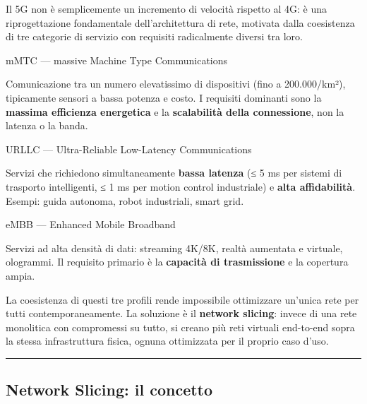 \documentclass[
  italian,
  openany]{book}
\begin{document}
Il 5G non è semplicemente un incremento di velocità rispetto al 4G: è
una riprogettazione fondamentale dell'architettura di rete, motivata
dalla coesistenza di tre categorie di servizio con requisiti
radicalmente diversi tra loro.

\begin{calloutdefinition}{mMTC — massive Machine Type Communications}

Comunicazione tra un numero elevatissimo di dispositivi (fino a
200.000/km²), tipicamente sensori a bassa potenza e costo. I requisiti
dominanti sono la \textbf{massima efficienza energetica} e la
\textbf{scalabilità della connessione}, non la latenza o la banda.

\end{calloutdefinition}

\begin{calloutdefinition}{URLLC — Ultra-Reliable Low-Latency Communications}

Servizi che richiedono simultaneamente \textbf{bassa latenza} (≤ 5 ms
per sistemi di trasporto intelligenti, ≤ 1 ms per motion control
industriale) e \textbf{alta affidabilità}. Esempi: guida autonoma, robot
industriali, smart grid.

\end{calloutdefinition}

\begin{calloutdefinition}{eMBB — Enhanced Mobile Broadband}

Servizi ad alta densità di dati: streaming 4K/8K, realtà aumentata e
virtuale, ologrammi. Il requisito primario è la \textbf{capacità di
trasmissione} e la copertura ampia.

\end{calloutdefinition}

La coesistenza di questi tre profili rende impossibile ottimizzare
un'unica rete per tutti contemporaneamente. La soluzione è il
\textbf{network slicing}: invece di una rete monolitica con compromessi
su tutto, si creano più reti virtuali end-to-end sopra la stessa
infrastruttura fisica, ognuna ottimizzata per il proprio caso d'uso.

\begin{center}\rule{0.5\linewidth}{0.5pt}\end{center}

\subsection{Network Slicing: il
concetto}\label{network-slicing-il-concetto}
\end{document}
